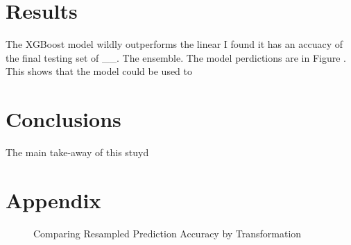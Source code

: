 \documentclass[16pt,twocolumn,letterpaper,titlepage]{article}
\begin{document}

\section{Results}

The XGBoost model wildly outperforms the linear I found it has an accuacy of the final testing set of __. The ensemble. The model perdictions are in Figure . This shows that the model could be used to 

\section{Conclusions}

The main take-away of this stuyd 

\clearpage
\onecolumn



\section{Appendix}

\begin{figure}[!htb]
	\caption{\label{fig:my-label} Comparing Resampled Prediction Accuracy by Transformation}
	
\end{figure}
\end{document}

